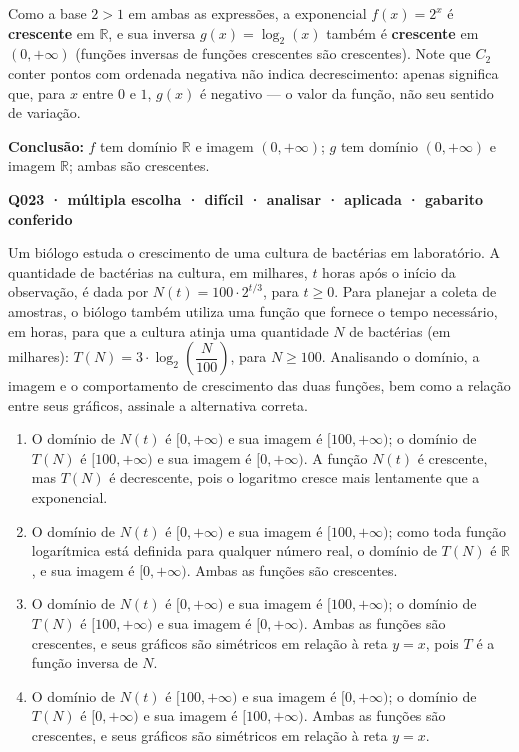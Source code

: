 \documentclass[11pt,a4paper]{article}
\begin{document}
Como a base $2>1$ em ambas as expressões, a exponencial $f(x)=2^x$ é \textbf{crescente} em $\mathbb{R}$, e sua inversa $g(x)=\log_2(x)$ também é \textbf{crescente} em $(0,+\infty)$ (funções inversas de funções crescentes são crescentes). Note que $C_2$ conter pontos com ordenada negativa não indica decrescimento: apenas significa que, para $x$ entre $0$ e $1$, $g(x)$ é negativo — o valor da função, não seu sentido de variação.

\textbf{Conclusão:} $f$ tem domínio $\mathbb{R}$ e imagem $(0,+\infty)$; $g$ tem domínio $(0,+\infty)$ e imagem $\mathbb{R}$; ambas são crescentes.

\bigskip\noindent\textbf{Q023 · múltipla escolha · difícil · analisar · aplicada · gabarito conferido}\par\nopagebreak
Um biólogo estuda o crescimento de uma cultura de bactérias em laboratório. A quantidade de bactérias na cultura, em milhares, $t$ horas após o início da observação, é dada por $N(t) = 100 \cdot 2^{t/3}$, para $t \geq 0$. Para planejar a coleta de amostras, o biólogo também utiliza uma função que fornece o tempo necessário, em horas, para que a cultura atinja uma quantidade $N$ de bactérias (em milhares): $T(N) = 3 \cdot \log_2\left(\dfrac{N}{100}\right)$, para $N \geq 100$. Analisando o domínio, a imagem e o comportamento de crescimento das duas funções, bem como a relação entre seus gráficos, assinale a alternativa correta.
\begin{enumerate}[label=(\alph*)]
\item O domínio de $N(t)$ é $[0,+\infty)$ e sua imagem é $[100,+\infty)$; o domínio de $T(N)$ é $[100,+\infty)$ e sua imagem é $[0,+\infty)$. A função $N(t)$ é crescente, mas $T(N)$ é decrescente, pois o logaritmo cresce mais lentamente que a exponencial.
\item O domínio de $N(t)$ é $[0,+\infty)$ e sua imagem é $[100,+\infty)$; como toda função logarítmica está definida para qualquer número real, o domínio de $T(N)$ é $\mathbb{R}$, e sua imagem é $[0,+\infty)$. Ambas as funções são crescentes.
\item O domínio de $N(t)$ é $[0,+\infty)$ e sua imagem é $[100,+\infty)$; o domínio de $T(N)$ é $[100,+\infty)$ e sua imagem é $[0,+\infty)$. Ambas as funções são crescentes, e seus gráficos são simétricos em relação à reta $y=x$, pois $T$ é a função inversa de $N$.
\item O domínio de $N(t)$ é $[100,+\infty)$ e sua imagem é $[0,+\infty)$; o domínio de $T(N)$ é $[0,+\infty)$ e sua imagem é $[100,+\infty)$. Ambas as funções são crescentes, e seus gráficos são simétricos em relação à reta $y=x$.
\end{enumerate}
\end{document}
